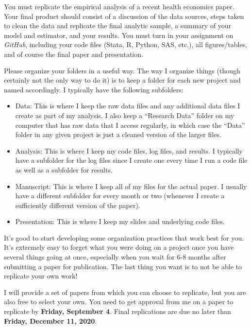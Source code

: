 \documentclass[11pt,]{article}
\begin{document}
You must replicate the empirical analysis of a recent health economics
paper. Your final product should consist of a discussion of the data
sources, steps taken to clean the data and replicate the final analytic
sample, a summary of your model and estimator, and your results. You
must turn in your assignment on \emph{GitHub}, including your code files
(Stata, R, Python, SAS, etc.), all figures/tables, and of course the
final paper and presentation.

Please organize your folders in a useful way. The way I organize things
(though certainly not the only way to do it) is to keep a folder for
each new project and named accordingly. I typically have the following
subfolders:

\begin{itemize}
\item
  Data: This is where I keep the raw data files and any additional data
  files I create as part of my analysis. I also keep a ``Research Data''
  folder on my computer that has raw data that I access regularly, in
  which case the ``Data'' folder in any given project is just a cleaned
  version of the larger files.
\item
  Analysis: This is where I keep my code files, log files, and results.
  I typically have a subfolder for the log files since I create one
  every time I run a code file as well as a subfolder for results.
\item
  Manuscript: This is where I keep all of my files for the actual paper.
  I usually have a different subfolder for every month or two (whenever
  I create a sufficiently different version of the paper).
\item
  Presentation: This is where I keep my slides and underlying code
  files.
\end{itemize}

It's good to start developing some organization practices that work best
for you. It's extremely easy to forget what you were doing on a project
once you have several things going at once, especially when you wait for
6-8 months after submitting a paper for publication. The last thing you
want is to not be able to replicate your own work!

I will provide a set of papers from which you can choose to replicate,
but you are also free to select your own. You need to get approval from
me on a paper to replicate by \textbf{Friday, September 4}. Final
replications are due no later than \textbf{Friday, December 11, 2020}.
\end{document}

